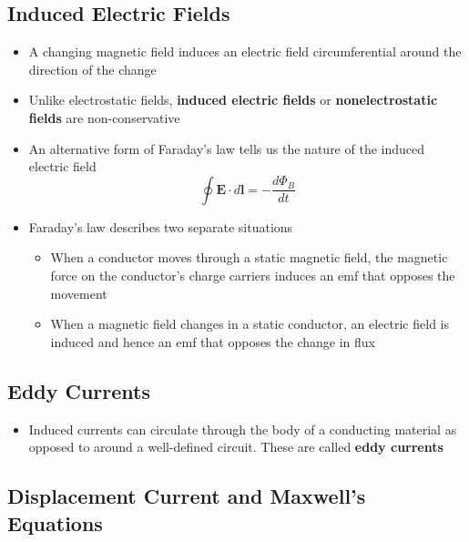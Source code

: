 \documentclass{article}
\begin{document}
\subsection{Induced Electric Fields}

\begin{itemize}
  \item A changing magnetic field induces an electric field circumferential around the direction of the change

  \item Unlike electrostatic fields, \textbf{induced electric fields} or \textbf{nonelectrostatic fields} are non-conservative

  \item An alternative form of Faraday's law tells us the nature of the induced electric field \[\oint \mathbf{E} \cdot d \mathbf{l} = -\frac{d \Phi_B}{dt}\]

  \item Faraday's law describes two separate situations

        \begin{itemize}
          \item When a conductor moves through a static magnetic field, the magnetic force on the conductor's charge carriers induces an emf that opposes the movement

          \item When a magnetic field changes in a static conductor, an electric field is induced and hence an emf that opposes the change in flux
        \end{itemize}
\end{itemize}

\subsection{Eddy Currents}

\begin{itemize}
  \item Induced currents can circulate through the body of a conducting material as opposed to around a well-defined circuit. These are called \textbf{eddy currents}
\end{itemize}

\subsection{Displacement Current and Maxwell's Equations}
\end{document}
